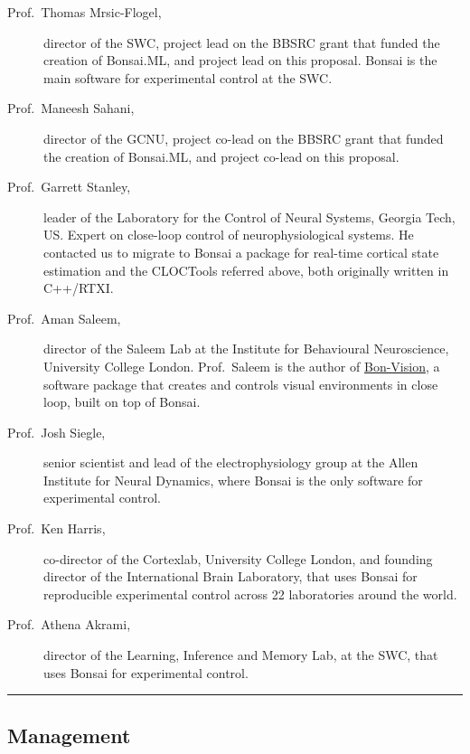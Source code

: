 \begin{description}

    \item[Prof.~Thomas Mrsic-Flogel,] director of the SWC, project lead on the
        BBSRC grant that funded the creation of Bonsai.ML, and project lead on
        this proposal. Bonsai is the main software for experimental control at
        the SWC.

    \item[Prof.~Maneesh Sahani,] director of the GCNU, project co-lead on the
        BBSRC grant that funded the creation of Bonsai.ML, and project co-lead
        on this proposal.

    \item[Prof.~Garrett Stanley,] leader of the Laboratory for the Control of
        Neural Systems, Georgia Tech, US. Expert on close-loop control of
        neurophysiological systems. He contacted us to migrate to Bonsai
        a package for real-time cortical state estimation and the CLOCTools
        referred above, both originally written in C++/RTXI.

    \item[Prof.~Aman Saleem,] director of the Saleem Lab at the Institute for
        Behavioural Neuroscience, University College London. Prof.~Saleem is the
        author of \href{https://bonvision.github.io/}{Bon-Vision}, a software
        package that creates and controls visual environments in close loop,
        built on top of Bonsai.

    \item[Prof.~Josh Siegle,] senior scientist and lead of the
        electrophysiology group at the Allen Institute for Neural Dynamics,
        where Bonsai is the only software for experimental control.

    \item[Prof.~Ken Harris,] co-director of the Cortexlab, University College
        London, and founding director of the International Brain Laboratory,
        that uses Bonsai for reproducible experimental control across 22
        laboratories around the world.

    \item[Prof.~Athena Akrami,] director of the Learning, Inference and Memory
        Lab, at the SWC, that uses Bonsai for experimental control.

\end{description}

\noindent\rule{\textwidth}{1pt}
\subsection*{Management}

